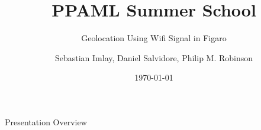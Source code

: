 \documentclass[dvips,11pt]{beamer}
\begin{document}
\title{PPAML Summer School}

\subtitle{Geolocation Using Wifi Signal in Figaro}

\author{Sebastian Imlay, Daniel Salvidore, Philip M. Robinson}


\date{\today}

\begin{frame}
  \titlepage
\end{frame}


\begin{frame}{Presentation Overview}

\end{frame}
\end{document}

